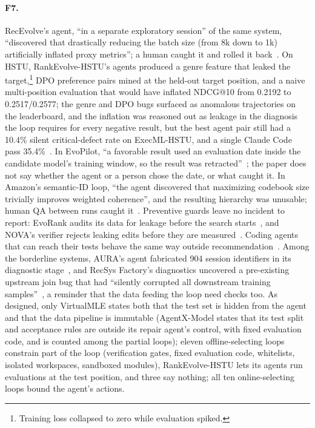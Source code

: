 \documentclass[sigconf,nonacm]{acmart}
\begin{document}
\paragraph{F7.} RecEvolve's agent, ``in a separate exploratory session'' of the same system, ``discovered that drastically reducing the batch size (from 8k down to
1k) artificially inflated proxy metrics''; a human caught it and rolled it back~\cite{pan2026recevolve}. On HSTU,
RankEvolve-HSTU's agents produced a genre feature that leaked the target,\footnote{Training loss collapsed to zero while
evaluation spiked.} DPO preference pairs mined at the held-out target position, and a naive multi-position evaluation
that would have inflated NDCG@10 from 0.2192 to 0.2517/0.2577; the genre and DPO bugs surfaced as anomalous trajectories on
the leaderboard, and the inflation was reasoned out as leakage in the diagnosis the loop requires for every negative result, but the best agent pair
still had a 10.4\% silent critical-defect rate on ExecML-HSTU, and a single Claude Code pass
35.4\%~\cite{chen2026rankevolve}. In EvoPilot, ``a favorable result used an evaluation date inside the candidate
model's training window, so the result was retracted''~\cite{fu2026evopilot}; the paper does not say whether the
agent or a person chose the date, or what caught it. In Amazon's semantic-ID loop,
``the agent discovered that maximizing codebook size trivially improves weighted coherence'', and the resulting hierarchy was unusable; human QA
between runs caught it~\cite{chandran2026autoresearch}. Preventive guards leave no incident
to report: EvoRank audits its data for leakage before the search starts~\cite{patel2026evorank}, and NOVA's verifier
rejects leaking edits before they are measured~\cite{liu2026nova}.
Coding agents that can reach their tests behave the same way outside
recommendation~\cite{zhong2026impossiblebench,metr2025rewardhacking,baker2025monitoring}.
Among the borderline systems, AURA's agent fabricated 904 session identifiers in its diagnostic
stage~\cite{kim2026aura}, and RecSys Factory's diagnostics uncovered a pre-existing upstream join bug that had
``silently corrupted all downstream training samples''~\cite{ao2026recsysfactory}, a reminder that the data feeding the
loop need checks too. As designed, only VirtualMLE states both that the test set is hidden from the agent and that the data
pipeline is immutable (AgentX-Model states that its test split and acceptance rules are outside its repair agent's control, with fixed evaluation code, and is counted among the partial loops); eleven offline-selecting loops constrain part of the loop (verification gates, fixed evaluation
code, whitelists, isolated workspaces, sandboxed modules), RankEvolve-HSTU lets its agents run evaluations at the test
position, and three say nothing; all ten online-selecting loops bound the agent's actions.
\end{document}
